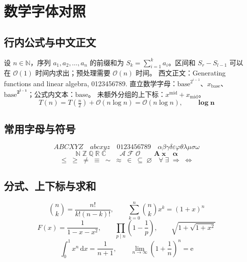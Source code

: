 \section{数学字体对照}
{\sffamily\color{BookMuted}\MathSampleName\par}
\subsection{行内公式与中文正文}
设 $n\in\mathbb{N}$，序列 $a_1,a_2,\ldots,a_n$ 的前缀和为
$S_k=\sum_{i=1}^{k}a_i$。区间和 $S_r-S_{l-1}$ 可以在
$\mathcal{O}(1)$ 时间内求出；预处理需要 $\mathcal{O}(n)$ 时间。
西文正文：Generating functions and linear algebra, 0123456789.
直立数学字母：$\mathrm{base}^{2^{i-1}}$、$x_{\mathrm{base}}$、
$\boldsymbol{\mathrm{base}^{2^{i-1}}}$；公式内文本：$\text{base}$。
未额外分组的上下标：$x^\mathrm{mid}+x_\mathrm{mid}$。
\[
  T(n)=T(\tfrac{n}{2})+\mathcal{O}(n\log n)=\mathcal{O}(n\log n),
  \qquad \boldsymbol{\log n}
\]

\subsection{常用字母与符号}
\[
  ABCXYZ\quad abcxyz\quad 0123456789\quad
  \alpha\beta\gamma\delta\varepsilon\varphi\theta\lambda\mu\sigma\omega
\]
\[
  \mathbb{N}\;\mathbb{Z}\;\mathbb{Q}\;\mathbb{R}\;\mathbb{C}
  \qquad \mathcal{A}\;\mathcal{F}\;\mathcal{O}
  \qquad \mathbf{A}\;\mathbf{x}\quad \boldsymbol{\alpha}
\]
\[
  \leq\;\geq\;\neq\;\equiv\;\sim\;\approx\;\in\;\subseteq\;\varnothing
  \quad \forall\;\exists\;\Rightarrow\;\Longleftrightarrow
\]

\subsection{分式、上下标与求和}
\[
  \binom{n}{k}=\frac{n!}{k!(n-k)!},\qquad
  \sum_{k=0}^{n}\binom{n}{k}x^k=(1+x)^n
\]
\[
  F(x)=\frac{1}{1-x-x^2},\qquad
  \prod_{p\mid n}\left(1-\frac{1}{p}\right),\qquad
  \sqrt{1+\sqrt{1+x^2}}
\]
\[
  \int_0^1 x^n\,\mathrm{d}x=\frac{1}{n+1},\qquad
  \lim_{n\to\infty}\left(1+\frac{1}{n}\right)^n=\mathrm{e}
\]


